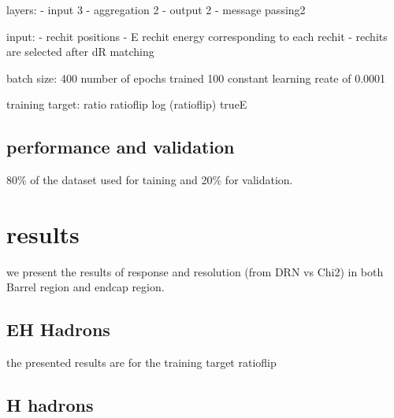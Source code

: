 layers:
- input 3
- aggregation 2
- output 2
- message passing2 

input:
- rechit positions
- E rechit energy corresponding to each rechit
- rechits are selected after dR matching %

batch size: 400
number of epochs trained 100
constant learning reate of 0.0001

training target:
ratio
ratioflip
log (ratioflip)
trueE

\subsection{performance and validation}
80\% of the dataset used for taining and 20\% for validation.

\section{results}
we present the results of response and resolution (from DRN vs Chi2) in  both Barrel region and endcap region.

\subsection{EH Hadrons}
the presented results are for the training target ratioflip





\subsection{H hadrons}




